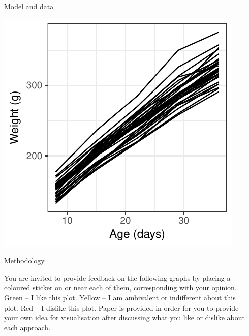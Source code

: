 {\begin{columns}
\begin{column}[t]{0.45\linewidth}
\begin{block}{Model and data}
\begin{minipage}{0.45\linewidth}
	\end{minipage}\quad
	\begin{minipage}{0.45\linewidth}
		
		\includegraphics[width=\linewidth]{data.pdf}
		
	\end{minipage}
	
\end{block}



\begin{block}{Methodology}
	
	\setlength{\parskip}{15pt}
	
	You are invited to provide feedback on the following graphs by placing a coloured sticker on or near each of them, corresponding with your opinion. Green -- I like this plot. Yellow -- I am ambivalent or indifferent about this plot. Red -- I dislike this plot. Paper is provided in order for you to provide your own idea for visualisation after discussing what you like or dislike about each approach.
	
\end{block}

\end{column}

 \begin{column}[t]{0.45\linewidth}
 



\end{column}
\end{columns}}
